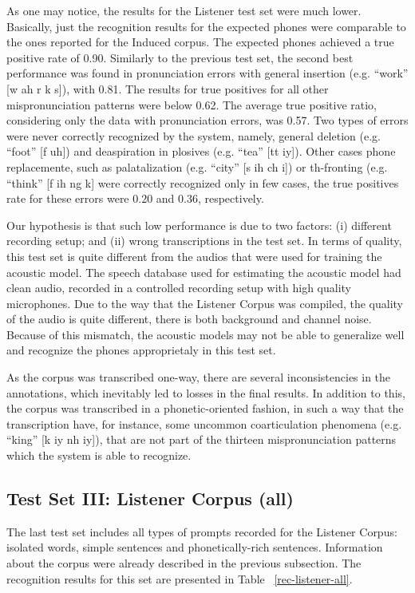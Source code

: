 \documentclass[twocolumn]{bmcart}%
\begin{document}
As one may notice, the results for the Listener test set were much lower. Basically, just the recognition results for the expected phones were comparable to the ones reported for the Induced corpus. The expected phones achieved a true positive rate of 0.90. Similarly to the previous test set, the second best performance was found in pronunciation errors with general insertion (e.g. ``work'' [w ah r k s]), with 0.81. The results for true positives for all other mispronunciation patterns were below 0.62. The average true positive ratio, considering only the data with pronunciation errors, was 0.57. Two types of errors were never correctly recognized by the system, namely, general deletion (e.g. ``foot'' [f uh]) and deaspiration in plosives (e.g. ``tea'' [tt iy]). Other cases  phone replacemente, such as palatalization (e.g. ``city'' [s ih ch i]) or th-fronting (e.g. ``think'' [f ih ng k] were correctly recognized only in few cases, the true positives rate for these errors were 0.20 and 0.36, respectively.

Our hypothesis is that such low performance is due to two factors: (i) different recording setup; and (ii) wrong transcriptions in the test set. In terms of quality, this test set is quite different from the audios that were used for training the acoustic model. The speech database used for estimating the acoustic model had clean audio, recorded in a controlled recording setup with high quality microphones. Due to the way that the Listener Corpus was compiled, the quality of the audio is quite different, there is both background and channel noise. Because of this mismatch, the acoustic models may not be able to generalize well and recognize the phones approprietaly in this test set. 

As the corpus was transcribed one-way, there are several inconsistencies in the annotations, which inevitably led to losses in the final results. In addition to this, the corpus was transcribed in a phonetic-oriented fashion, in such a way that the transcription have, for instance, some uncommon coarticulation phenomena (e.g. ``king'' [k iy nh iy]), that are not part of the thirteen mispronunciation patterns which the system is able to recognize. 

\subsection*{\textbf{Test Set III: Listener Corpus (all)}}

The last test set includes all types of prompts recorded for the Listener Corpus: isolated words, simple sentences and phonetically-rich sentences. Information about the corpus were already described in the previous subsection. The recognition results for this set are presented in Table ~\ref{rec-listener-all}.
\end{document}
